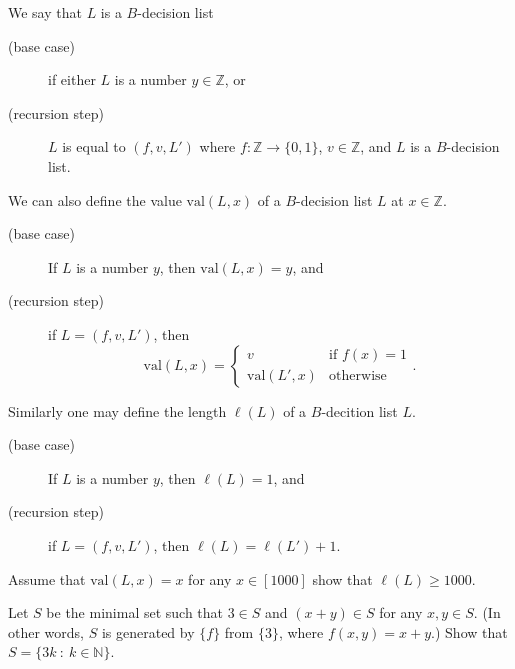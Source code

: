 \documentclass[addpoints]{exam}
\begin{document}
  \pagestyle{headandfoot}
  \runningheadrule

  \firstpagefooter{}{}{}
  \runningfooter{}{}{}
  \begin{flushright}

    \vspace{0.2in}
  \end{flushright}

  \begin{questions}
    \question[10]
      We say that $L$ is a $B$-decision list 
			\begin{description}
			  \item[(base case)] if either $L$ is a number $y \in \mathbb{Z}$, or
			  \item[(recursion step)] $L$ is equal to $(f, v, L')$ where $f : \mathbb{Z} \to
			  \{0, 1\}$, $v \in \mathbb{Z}$, and $L$ is a $B$-decision list.
			\end{description}
			
			We can also define the value $\mathrm{val}(L, x)$ of a $B$-decision list $L$ at
			$x \in \mathbb{Z}$.
			\begin{description}
			  \item[(base case)] If $L$ is a number $y$, then $\mathrm{val}(L, x) = y$, and
			  \item[(recursion step)] if $L = (f, v, L')$, then
			    \[
			      \mathrm{val}(L, x) = 
			      \begin{cases}
			        v & \text{if } f(x) = 1 \\
			        \mathrm{val}(L', x) & \text{otherwise}
			      \end{cases}.
			    \]
			\end{description}
			
			Similarly one may define the length $\ell(L)$ of a $B$-decition list $L$.
			\begin{description}
			  \item[(base case)] If $L$ is a number $y$, then $\ell(L) = 1$, and
			  \item[(recursion step)] if $L = (f, v, L')$, then $\ell(L) = \ell(L') + 1$.
			\end{description}
			
			Assume that $\mathrm{val}(L, x) = x$ for any $x \in [1000]$ show that 
			$\ell(L) \ge 1000$.

      \begin{solution}[\stretch{1}]
      \end{solution}
      \newpage
    \question[10]
      Let $S$ be the minimal set such that $3 \in S$ and $(x + y) \in S$ for any $x, y \in S$.
			(In other words, $S$ is generated by $\{f\}$ from $\{3\}$, where $f(x, y) = x + y$.)
			Show that $S = \{3k ~:~ k \in \mathbb{N}\}$.

      \begin{solution}[\stretch{1}]
      \end{solution}
      \newpage
  \end{questions}
\end{document}
